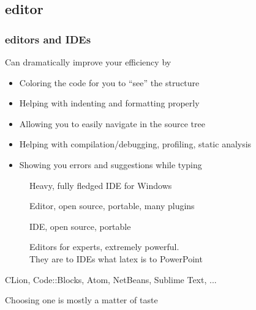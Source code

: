 \subsection[edit]{\cpp editor}

\begin{frame}[fragile]
  \frametitle{\cpp editors and IDEs}
  \begin{block}{Can dramatically improve your efficiency by}
    \begin{itemize}
      \item Coloring the code for you to ``see'' the structure
      \item Helping with indenting and formatting properly
      \item Allowing you to easily navigate in the source tree
      \item Helping with compilation/debugging, profiling, static analysis
      \item Showing you errors and suggestions while typing
    \end{itemize}
  \end{block}
  \begin{block}{}
    \begin{description}
    \item[\href{http://www.microsoft.com/}{}]
      Heavy, fully fledged IDE for Windows
    \item[\href{https://code.visualstudio.com/}{}]
      Editor, open source, portable, many plugins
    \item[\href{https://www.eclipse.org/}{}]
      IDE, open source, portable
    \item[\href{http://www.gnu.org/software/emacs/}{} \href{https://www.vim.org/}{}]
      Editors for experts, extremely powerful. \\
      They are to IDEs what latex is to PowerPoint
    \item[CLion, Code::Blocks, Atom, NetBeans, Sublime Text, ...]
    \end{description}
    Choosing one is mostly a matter of taste
  \end{block}
\end{frame}

